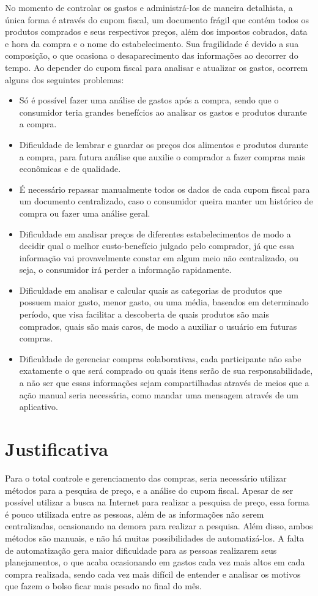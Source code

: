 No momento de controlar os gastos e administrá-los de maneira detalhista, a única forma é através do cupom fiscal, um documento frágil que contém todos os produtos comprados e seus respectivos preços, além dos impostos cobrados, data e hora da compra e o nome do estabelecimento. Sua fragilidade é devido a sua composição, o que ocasiona o desaparecimento das informações ao decorrer do tempo. Ao depender do cupom fiscal para analisar e atualizar os gastos, ocorrem alguns dos seguintes problemas:
\begin{itemize}
\item Só é possível fazer uma análise de gastos após a compra, sendo que o consumidor teria grandes benefícios ao analisar os gastos e produtos durante a compra.
\item Dificuldade de lembrar e guardar os preços dos alimentos e produtos durante a compra, para futura análise que auxilie o comprador a fazer compras mais econômicas e de qualidade.
\item É necessário repassar manualmente todos os dados de cada cupom fiscal para um documento centralizado, caso o consumidor queira manter um histórico de compra ou fazer uma análise geral.
\item Dificuldade em analisar preços de diferentes estabelecimentos de modo a decidir qual o melhor custo-benefício julgado pelo comprador, já que essa informação vai provavelmente constar em algum meio não centralizado, ou seja, o consumidor irá perder a informação rapidamente.
\item Dificuldade em analisar e calcular quais as categorias de produtos que possuem maior gasto, menor gasto, ou uma média, baseados em determinado período, que visa facilitar a descoberta de quais produtos são mais comprados, quais são mais caros, de modo a auxiliar o usuário em futuras compras.
\item Dificuldade de gerenciar compras colaborativas, cada participante não sabe exatamente o que será comprado ou quais itens serão de sua responsabilidade, a não ser que essas informações sejam compartilhadas através de meios que a ação manual seria necessária, como mandar uma mensagem através de um aplicativo.
\end{itemize}

\label{sec:justificativa}
\section{Justificativa}
Para o total controle e gerenciamento das compras, seria necessário utilizar métodos para a pesquisa de preço, e a análise do cupom fiscal. Apesar de ser possível utilizar a busca na Internet para realizar a pesquisa de preço, essa forma é pouco utilizada entre as pessoas, além de as informações não serem centralizadas, ocasionando na demora para realizar a pesquisa. Além disso, ambos métodos são manuais, e não há muitas possibilidades de automatizá-los. A falta de automatização gera maior dificuldade para as pessoas realizarem seus planejamentos, o que acaba ocasionando em gastos cada vez mais altos em cada compra realizada, sendo cada vez mais difícil de entender e analisar os motivos que fazem o bolso ficar mais pesado no final do mês.


